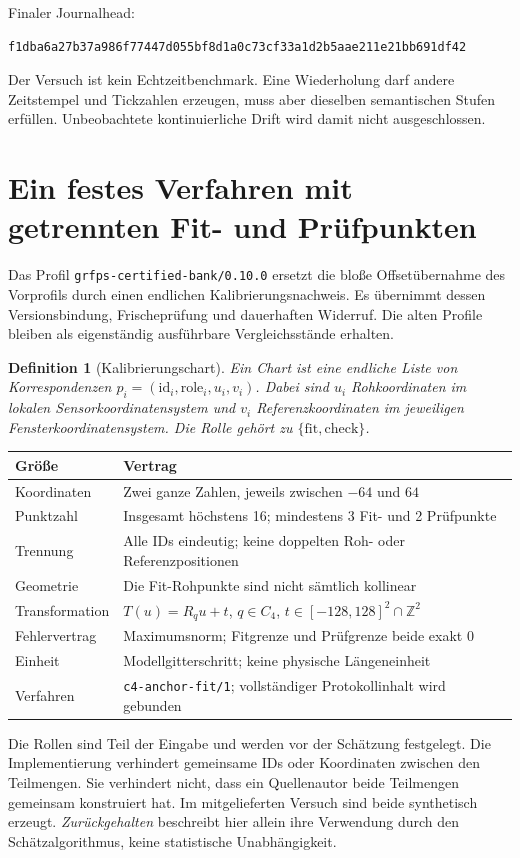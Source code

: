 \documentclass[11pt,a4paper]{article}
\newcommand{\nextsection}[2]{\clearpage{\color{accent}\small\textsf{#1}}\section{#2}}
\newtheorem{definition}[proposition]{Definition}
\begin{document}
Finaler Journalhead:
\begin{lstlisting}
f1dba6a27b37a986f77447d055bf8d1a0c73cf33a1d2b5aae211e21bb691df42
\end{lstlisting}
Der Versuch ist kein Echtzeitbenchmark. Eine Wiederholung darf
andere Zeitstempel und Tickzahlen erzeugen, muss aber dieselben
semantischen Stufen erfüllen. Unbeobachtete kontinuierliche Drift
wird damit nicht ausgeschlossen.

\nextsection{55 / KALIBRIERUNGSDATEN}{Ein festes Verfahren mit getrennten Fit- und Prüfpunkten}
Das Profil \texttt{grfps-certified-bank/0.10.0} ersetzt die bloße
Offsetübernahme des Vorprofils durch einen endlichen
Kalibrierungsnachweis. Es übernimmt dessen Versionsbindung,
Frischeprüfung und dauerhaften Widerruf. Die alten Profile bleiben
als eigenständig ausführbare Vergleichsstände erhalten.

\begin{definition}[Kalibrierungschart]
Ein Chart ist eine endliche Liste von Korrespondenzen
\(p_i=(\mathrm{id}_i,\mathrm{role}_i,u_i,v_i)\).
Dabei sind \(u_i\) Rohkoordinaten im lokalen Sensorkoordinatensystem
und \(v_i\) Referenzkoordinaten im jeweiligen Fensterkoordinatensystem.
Die Rolle gehört zu \(\{\mathrm{fit},\mathrm{check}\}\).
\end{definition}

\begin{tabularx}{\linewidth}{@{}lY@{}}
\toprule
Größe & Vertrag\\\midrule
Koordinaten & Zwei ganze Zahlen, jeweils zwischen $-64$ und $64$\\
Punktzahl & Insgesamt höchstens 16; mindestens 3 Fit- und 2 Prüfpunkte\\
Trennung & Alle IDs eindeutig; keine doppelten Roh- oder Referenzpositionen\\
Geometrie & Die Fit-Rohpunkte sind nicht sämtlich kollinear\\
Transformation & $T(u)=R_q u+t$, $q\in C_4$, $t\in[-128,128]^2\cap\mathbb Z^2$\\
Fehlervertrag & Maximumsnorm; Fitgrenze und Prüfgrenze beide exakt 0\\
Einheit & Modellgitterschritt; keine physische Längeneinheit\\
Verfahren & \texttt{c4-anchor-fit/1}; vollständiger Protokollinhalt wird gebunden\\
\bottomrule
\end{tabularx}

Die Rollen sind Teil der Eingabe und werden vor der Schätzung
festgelegt. Die Implementierung verhindert gemeinsame IDs oder
Koordinaten zwischen den Teilmengen. Sie verhindert nicht, dass ein
Quellenautor beide Teilmengen gemeinsam konstruiert hat.
Im mitgelieferten Versuch sind beide synthetisch erzeugt.
\emph{Zurückgehalten} beschreibt hier allein ihre Verwendung durch
den Schätzalgorithmus, keine statistische Unabhängigkeit.
\end{document}
